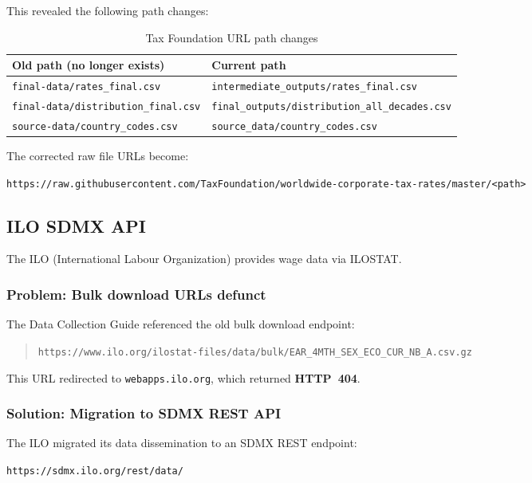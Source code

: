\documentclass[12pt,a4paper]{article}
\begin{document}
This revealed the following path changes:

\begin{table}[H]
\centering
\caption{Tax Foundation URL path changes}
\label{tab:tf_paths}
\small
\begin{tabular}{p{5.5cm}p{5.5cm}}
\toprule
\textbf{Old path (no longer exists)} & \textbf{Current path} \\
\midrule
\texttt{final-data/rates\_final.csv} & \texttt{intermediate\_outputs/rates\_final.csv} \\
\texttt{final-data/distribution\_final.csv} & \texttt{final\_outputs/distribution\_all\_decades.csv} \\
\texttt{source-data/country\_codes.csv} & \texttt{source\_data/country\_codes.csv} \\
\bottomrule
\end{tabular}
\end{table}

The corrected raw file URLs become:
\begin{center}
\small\texttt{https://raw.githubusercontent.com/TaxFoundation/worldwide-corporate-tax-rates/master/<path>}
\end{center}


\subsection{ILO SDMX API}\label{sec:ilo_discovery}

The ILO (International Labour Organization) provides wage data via ILOSTAT.

\subsubsection{Problem: Bulk download URLs defunct}

The Data Collection Guide referenced the old bulk download endpoint:
\begin{quote}
\small\texttt{https://www.ilo.org/ilostat-files/data/bulk/EAR\_4MTH\_SEX\_ECO\_CUR\_NB\_A.csv.gz}
\end{quote}
This URL redirected to \texttt{webapps.ilo.org}, which returned \textbf{HTTP~404}.

\subsubsection{Solution: Migration to SDMX REST API}

The ILO migrated its data dissemination to an SDMX REST endpoint:
\begin{apibox}
\texttt{https://sdmx.ilo.org/rest/data/}
\end{apibox}
\end{document}
